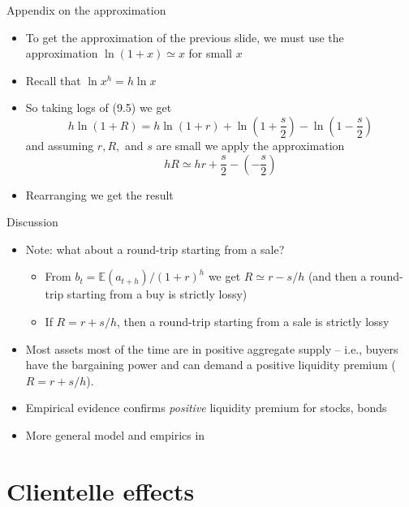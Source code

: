 \documentclass[english,10pt
,aspectratio=169
]{beamer}
\begin{document}
\begin{frame}{Appendix on the approximation}
	\begin{itemize}
		\item To get the approximation of the previous slide, we must use the approximation $\ln (1+x) \simeq x$ for small $x$
		\item Recall that $\ln x^h = h \ln x$
		\item So taking logs of (9.5) we get
		\[
		h \ln (1+R) = h\ln (1+r) + \ln(1+\frac{s}{2}) - \ln(1-\frac{s}{2}) 
		\]
		and assuming $r, R,$ and $s$ are small we apply the approximation
		\[
		hR \simeq hr+\frac{s}{2}- \left(-\frac{s}{2}\right)
		\]
		\item Rearranging we get the result
	\end{itemize}
\end{frame}


\begin{frame}{Discussion}
	\begin{itemize}
		\item Note: what about a round-trip starting from a sale?
		\begin{itemize}
			\item From $b_t=\mathbb{E}(a_{t+h})/(1+r)^h$ we get $R \simeq r-s/h$ (and then a round-trip starting from a buy is strictly lossy)
			\item If $R = r + s/h$, then a round-trip starting from a sale is strictly lossy
		\end{itemize}
		\item Most assets most of the time are in positive aggregate supply -- i.e., buyers have the bargaining power and can demand a positive liquidity premium ($R = r + s/h$).
		\item Empirical evidence confirms \emph{positive} liquidity premium for stocks, bonds
		\item More general model and empirics in \citet*{bongaerts_derivative_2011}
	\end{itemize}
\end{frame}



\section{Clientelle effects}
\end{document}
